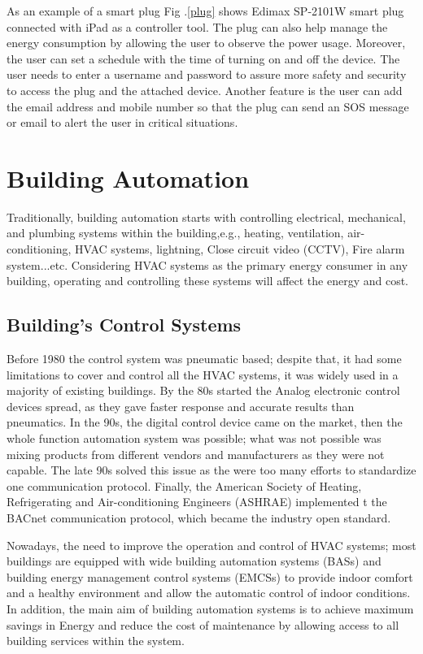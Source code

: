 \documentclass[conference]{IEEEtran}
\begin{document}
As an example of a smart plug Fig .\ref{plug} shows  Edimax SP-2101W smart plug connected with iPad as a controller tool. The plug can also help manage the energy consumption by allowing the user to observe the power usage. Moreover, the user can set a schedule with the time of turning on and off the device. The user needs to enter a username and password to assure more safety and security to access the plug and the attached device. Another feature is the user can add the email address and mobile number so that the plug can send an SOS message or email to alert the user in critical situations. 


\section{Building  Automation }

Traditionally, building automation starts with controlling electrical, mechanical, and plumbing systems within the building,e.g., heating, ventilation, air-conditioning, HVAC systems, lightning,  Close circuit video (CCTV), Fire alarm system...etc. Considering HVAC systems as the primary energy consumer in any building, operating and controlling these systems will affect the energy and cost.

\subsection{Building's Control Systems}

Before 1980 the control system was pneumatic based; despite that, it had some limitations to cover and control all the HVAC systems, it was widely used in a majority of existing buildings. By the 80s started the Analog electronic control devices spread, as they gave faster response and accurate results than pneumatics\cite{art}. In the 90s, the digital control device came on the market, then the whole function automation system was possible; what was not possible was mixing products from different vendors and manufacturers as they were not capable. The late 90s solved this issue as the were too many efforts to standardize one communication protocol. Finally, the American Society of Heating, Refrigerating and Air-conditioning Engineers (ASHRAE) implemented t the BACnet communication protocol, which became the industry open standard.\cite{control}\cite{art}

 Nowadays, the need to improve the operation and control of HVAC systems; most buildings are equipped with wide building automation systems (BASs) and building energy management control systems (EMCSs) to provide indoor comfort and a healthy environment and allow the automatic control of indoor conditions. In addition, the main aim of building automation systems is to achieve maximum savings in Energy and reduce the cost of maintenance by allowing access to all building services within the system.
\end{document}
